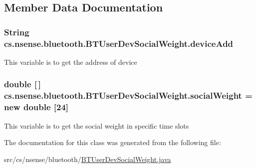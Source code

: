 \subsection{Member Data Documentation}
\hypertarget{classcs_1_1nsense_1_1bluetooth_1_1_b_t_user_dev_social_weight_afae4e5e333da3b94d18bfd04fab5af6e}{
\subsubsection[{device\-Add}]{\setlength{\rightskip}{0pt plus 5cm}String cs.\-nsense.\-bluetooth.\-B\-T\-User\-Dev\-Social\-Weight.\-device\-Add\hspace{0.3cm}{\ttfamily [private]}}}\label{classcs_1_1nsense_1_1bluetooth_1_1_b_t_user_dev_social_weight_afae4e5e333da3b94d18bfd04fab5af6e}
This variable is to get the address of device \hypertarget{classcs_1_1nsense_1_1bluetooth_1_1_b_t_user_dev_social_weight_a7d8568ebbd7ef46a84f6a61d015b09e0}{
\subsubsection[{social\-Weight}]{\setlength{\rightskip}{0pt plus 5cm}double \mbox{[}$\,$\mbox{]} cs.\-nsense.\-bluetooth.\-B\-T\-User\-Dev\-Social\-Weight.\-social\-Weight = new double \mbox{[}24\mbox{]}\hspace{0.3cm}{\ttfamily [private]}}}\label{classcs_1_1nsense_1_1bluetooth_1_1_b_t_user_dev_social_weight_a7d8568ebbd7ef46a84f6a61d015b09e0}
This variable is to get the social weight in specific time slots 

The documentation for this class was generated from the following file\-:\begin{DoxyCompactItemize}
\item 
src/cs/nsense/bluetooth/\hyperlink{_b_t_user_dev_social_weight_8java}{B\-T\-User\-Dev\-Social\-Weight.\-java}\end{DoxyCompactItemize}
